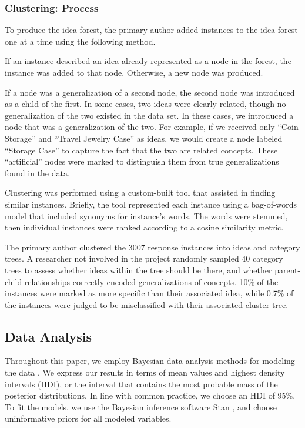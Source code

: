 \subsubsection{Clustering: Process}
To produce the idea forest, the primary author added instances to the idea forest one at a time using the following method.

If an instance described an idea already represented as a node in the forest, the instance was added to that node. Otherwise, a new node was produced.

If a node was a generalization of a second node, the second node was introduced as a child of the first. In some cases, two ideas were clearly related, though no generalization of the two existed in the data set. In these cases, we introduced a node that was a generalization of the two. For example, if we received only ``Coin Storage'' and ``Travel Jewelry Case'' as ideas, we would create a node labeled ``Storage Case'' to capture the fact that the two are related concepts. These ``artificial'' nodes were marked to distinguish them from true generalizations found in the data.

Clustering was performed using a custom-built tool that assisted in finding similar instances. Briefly, the tool represented each instance using a bag-of-words model that included synonyms for instance's words. The words were stemmed, then individual instances were ranked according to a cosine similarity metric.

The primary author clustered the 3007 response instances into ideas and category trees. A researcher not involved in the project randomly sampled 40 category trees to assess whether ideas within the tree should be there, and whether parent-child relationships correctly encoded generalizations of concepts. 10\% of the instances were marked as more specific than their associated idea, while 0.7\% of the instances were judged to be misclassified with their associated cluster tree.

\subsection{Data Analysis}
Throughout this paper, we employ Bayesian data analysis methods for modeling the data \cite{kruschke_doing_2010}. We express our results in terms of mean values and highest density intervals (HDI), or the interval that contains the most probable mass of the posterior distributions. In line with common practice, we choose an HDI of 95\%. To fit the models, we use the Bayesian inference software Stan \cite{stan-software:2013}, and choose uninformative priors for all modeled variables.

